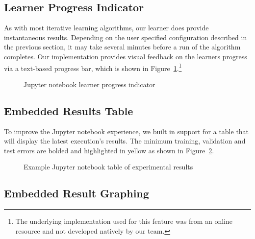 \documentclass{report}
\begin{document}
  \subsection{Learner Progress Indicator}
  
  As with most iterative learning algorithms, our learner does provide instantaneous results.  Depending on the user specified configuration described in the previous section, it may take several minutes before a run of the algorithm completes.  Our implementation provides visual feedback on the learners progress via a text-based progress bar, which is shown in Figure~\ref{fig:jupyterProgressBar}.\footnote{The underlying implementation used for this feature was from an online resource and not developed natively by our team.}
  
  \begin{figure}[tb]
    \centering
    \caption{Jupyter notebook learner progress indicator}\label{fig:jupyterProgressBar}
  \end{figure}

  \subsection{Embedded Results Table}
  
  To improve the Jupyter notebook experience, we built in support for a table that will display the latest execution's results.  The minimum training, validation and test errors are bolded and highlighted in yellow as shown in Figure~\ref{fig:jupyterTable}.
    
  \begin{figure}[tb]
    \centering
    \caption{Example Jupyter notebook table of experimental results}\label{fig:jupyterTable}
  \end{figure}
  
  \subsection{Embedded Result Graphing}
  
\end{document}
